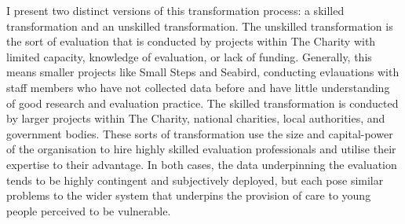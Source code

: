 I present two distinct versions of this transformation process: a skilled transformation and an unskilled transformation. The unskilled transformation is the sort of evaluation that is conducted by projects within The Charity with limited capacity, knowledge of evaluation, or lack of funding. Generally, this means smaller projects like Small Steps and Seabird, conducting evlauations with staff members who have not collected data before and have little understanding of good research and evaluation practice. The skilled transformation is conducted by larger projects within The Charity, national charities, local authorities, and government bodies. These sorts of transformation use the size and capital-power of the organisation to hire highly skilled evaluation professionals and utilise their expertise to their advantage. In both cases, the data underpinning the evaluation tends to be highly contingent and subjectively deployed, but each pose similar problems to the wider system that underpins the provision of care to young people perceived to be vulnerable.


